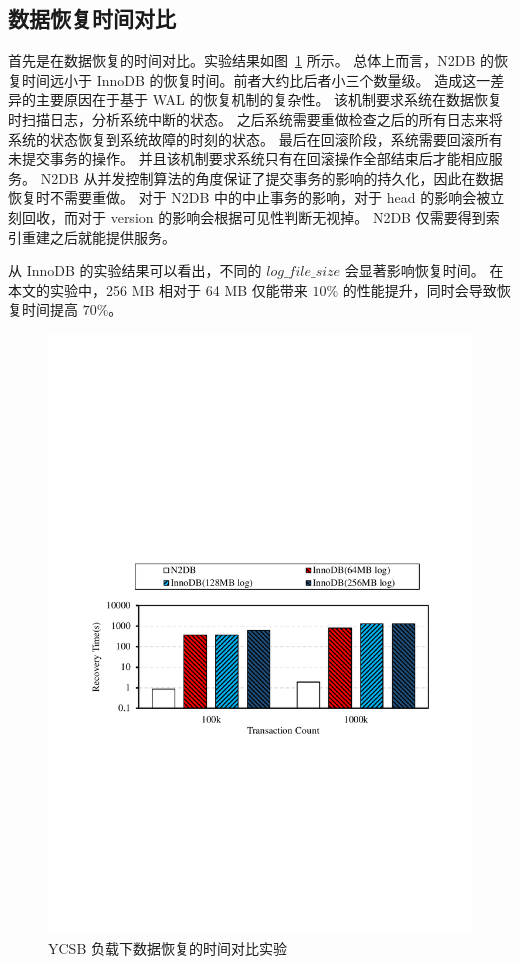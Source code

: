 \subsection{数据恢复时间对比}

首先是在数据恢复的时间对比。实验结果如图~\ref{fig:recovery-time-ycsb} 所示。
总体上而言，N2DB 的恢复时间远小于 InnoDB 的恢复时间。前者大约比后者小三个数量级。
造成这一差异的主要原因在于基于 WAL 的恢复机制的复杂性。
该机制要求系统在数据恢复时扫描日志，分析系统中断的状态。
之后系统需要重做检查之后的所有日志来将系统的状态恢复到系统故障的时刻的状态。
最后在回滚阶段，系统需要回滚所有未提交事务的操作。
并且该机制要求系统只有在回滚操作全部结束后才能相应服务。
N2DB 从并发控制算法的角度保证了提交事务的影响的持久化，因此在数据恢复时不需要重做。
对于 N2DB 中的中止事务的影响，对于 head 的影响会被立刻回收，而对于 version 的影响会根据可见性判断无视掉。
N2DB 仅需要得到索引重建之后就能提供服务。

从 InnoDB 的实验结果可以看出，不同的 $log\_file\_size$ 会显著影响恢复时间。
在本文的实验中，256 MB 相对于 64 MB 仅能带来 $10\%$ 的性能提升，同时会导致恢复时间提高 $70\%$。


\begin{figure}
    \centering
    \includegraphics[width=15cm, trim={1cm 9cm 1cm 10cm}]{figures/recovery-time.pdf}
    \caption{YCSB 负载下数据恢复的时间对比实验}
    \label{fig:recovery-time-ycsb}
\end{figure}

